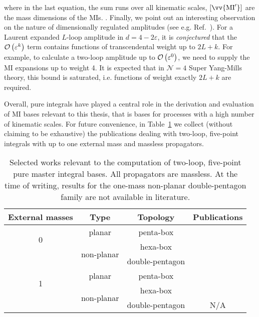 \documentclass[main.tex]{subfiles}
\begin{document}
where in the last equation, the sum runs over all kinematic scales, $[\vv{\text{MI}'}]$ are the mass dimensions of the MIs. . Finally, we point out an interesting observation on the nature of dimensionally regulated amplitudes (see e.g. Ref.~\cite{Duhr:2014woa}). For a Laurent expanded $L$-loop amplitude in $d = 4- 2\varepsilon$, it is \textit{conjectured} that the $\mathcal{O}\left(\varepsilon^k\right)$ term contains functions of transcendental weight up to $2L+k$. For example, to calculate a two-loop amplitude up to $\mathcal{O}\left(\varepsilon^0\right)$, we need to supply the MI expansions up to weight 4. It is expected that in $\mathcal{N}=4$ Super Yang-Mills theory, this bound is saturated, i.e. functions of weight exactly $2L+k$ are required.

Overall, pure integrals have played a central role in the derivation and evaluation of MI bases relevant to this thesis, that is bases for processes with a high number of kinematic scales. For future convenience, in Table~\ref{tab:MIs} we collect (without claiming to be exhaustive) the publications dealing with two-loop, five-point integrals with up to one external mass and massless propagators.
\begin{table}[b]
	\begin{center}
		\begin{tabular}{|c|c|c|c|}
            \hline
            External masses & Type & Topology & Publications \\
			\hline
            \multirow{2}{0cm}{0} & planar & penta-box & \cite{Gehrmann:2015bfy,Papadopoulos:2015jft, Gehrmann:2018yef, Abreu:2018aqd, Chicherin:2020oor} \\
            \cline{2-4}
            & \multirow{2}{2cm}{non-planar} & hexa-box & \cite{Chicherin:2018mue, Chicherin:2017dob, Chicherin:2018ubl, Chicherin:2018wes, Abreu:2018rcw, Chicherin:2020oor, Abreu:2018aqd} \\
            & & double-pentagon & \cite{Chicherin:2018old, Abreu:2018aqd, Chicherin:2020oor} \\
            \hline
            \multirow{2}{0cm}{1} & planar & penta-box & \cite{Abreu:2020jxa, Chicherin:2021dyp, Canko:2020ylt} \\
            \cline{2-4}
            & \multirow{2}{2cm}{non-planar} & hexa-box & \cite{abreu2021twoloop, Kardos:2022tpo, Papadopoulos:2019iam, Chicherin:2021dyp} \\
            & & double-pentagon & N/A \\
            \hline
		\end{tabular}
\end{center}
\caption{Selected works relevant to the computation of two-loop, five-point pure master integral bases. All propagators are massless. At the time of writing, results for the one-mass non-planar double-pentagon family are not available in literature.}
\label{tab:MIs}
\end{table}
\end{document}
